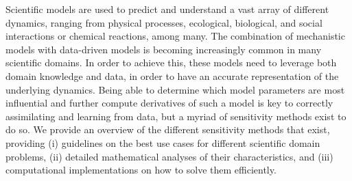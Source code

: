 Scientific models are used to predict and understand a vast array of different dynamics, ranging from physical processes, ecological, biological, and social interactions or chemical reactions, among many. 
The combination of mechanistic models with data-driven models is becoming increasingly common in many scientific domains. 
In order to achieve this, these models need to leverage both domain knowledge and data, in order to have an accurate representation of the underlying dynamics. 
Being able to determine which model parameters are most influential and further compute derivatives of such a model is key to correctly assimilating and learning from data, but a myriad of sensitivity methods exist to do so. 
We provide an overview of the different sensitivity methods that exist, providing (i) guidelines on the best use cases for different scientific domain problems, (ii) detailed mathematical analyses of their characteristics, and (iii) computational implementations on how to solve them efficiently. 
